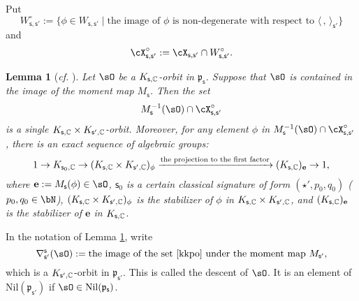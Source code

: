 \documentclass[12pt,a4paper]{amsart}
\newcommand{\p}{\mathfrak p}
\newcommand{\la}{\langle}
\newcommand{\ra}{\rangle}
\newcommand{\be}{\begin {equation}}
\newcommand{\ee}{\end {equation}}
\numberwithin{equation}{section}
\newtheorem{lem}[thm]{Lemma}
\theoremstyle{remark}
\def\cf{\emph{cf.} }
\begin{document}
Put
\[
  W_{\mathsf s, \mathsf s'}^\circ:=\{\phi\in W_{\mathsf s, \mathsf s'}\mid \textrm{the image of $\phi$ is non-degenerate with respect to $\la\,,\,\ra_{\mathsf s'}$}\}
\]
and
\[
  \cX_{\mathsf s, \mathsf s'}^\circ:=\cX_{\mathsf s, \mathsf s'}\cap W_{\mathsf s, \mathsf s'}^\circ.
\]

\begin{lem}[{\cf \cite[Lemma 13]{Ohta}}]\label{descko}
Let $\sO$ be a $K_{\mathsf s, \mathbb{C}}$-orbit in $\p_{\mathsf s}$. Suppose that $\sO$ is contained in the image of the moment map $M_\mathsf s$. Then the set
\be\label{kkpo}
  M_{\mathsf s}^{-1}(\sO)\cap \cX_{\mathsf s, \mathsf s'}^\circ
\ee
is a single $K_{\mathsf s,\mathbb{C}}\times K_{\mathsf s', \mathbb{C}}$-orbit. Moreover, for any element $\phi$ in $M_{\mathsf s}^{-1}(\sO)\cap \cX_{\mathsf s, \mathsf s'}^\circ$, there is an exact sequence of algebraic groups:
\[
  1\rightarrow K_{\mathsf s_0,\mathbb{C}}\rightarrow (K_{\mathsf s,\mathbb{C}}\times K_{\mathsf s', \mathbb{C}})_\phi\xrightarrow{\textrm{the projection to the first factor}} (K_{\mathsf s,\mathbb{C}})_{\mathbf e}\rightarrow 1,
\]
where $\mathbf e:=M_\mathsf s(\phi)\in \sO$,  $\mathsf s_0$ is a certain classical signature of form $(\star', p_0,q_0)$ ($p_0,q_0\in \bN$), $(K_{\mathsf s,\mathbb{C}}\times K_{\mathsf s', \mathbb{C}})_\phi$ is the stabilizer of $\phi$ in $K_{\mathsf s,\mathbb{C}}\times K_{\mathsf s', \mathbb{C}}$, and $(K_{\mathsf s,\mathbb{C}})_{\mathbf e}$ is the stabilizer of $\mathbf e$ in $K_{\mathsf s,\mathbb{C}}$.
\end{lem}


In the notation of Lemma \ref{descko}, write
\[
  \nabla^{\mathsf s}_{\mathsf s'}(\sO):=\textrm{the image of the set \eqref{kkpo} under the moment map  $M_{\mathsf s'}$,}
\]
which is a $ K_{\mathsf s', \mathbb{C}}$-orbit in $\p_{\mathsf s'}$. This is called the descent of $\sO$. It is an element of $\mathrm{Nil}(\p_{\mathsf s'})$ if $\sO\in \mathrm{Nil}(\p_{\mathsf s})$.
\end{document}
